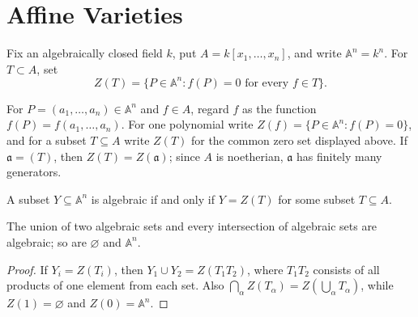 
\section{Affine Varieties}

Fix an algebraically closed field $k$, put $A=k[x_1,\ldots,x_n]$, and write
\(\mathbb A^n=k^n\).  For $T\subset A$, set
\[
Z(T)=\{P\in\mathbb A^n:f(P)=0\text{ for every }f\in T\}.
\]

\begin{definition}
\label{def:ha-ch1-polynomial-evaluation}
\leanok
For $P=(a_1,\ldots,a_n)\in\mathbb A^n$ and $f\in A$, regard $f$ as the function
$f(P)=f(a_1,\ldots,a_n)$.  For one polynomial write
$Z(f)=\{P\in\mathbb A^n:f(P)=0\}$, and for a subset $T\subseteq A$ write $Z(T)$
for the common zero set displayed above.  If $\mathfrak a=(T)$, then
$Z(T)=Z(\mathfrak a)$; since $A$ is noetherian, $\mathfrak a$ has finitely many generators.
\end{definition}

\begin{definition}
\label{def:ha-ch1-algebraic-set}
A subset $Y\subseteq\mathbb A^n$ is algebraic if and only if $Y=Z(T)$ for some subset
$T\subseteq A$.
\end{definition}

\begin{proposition}
\label{prop:ha-ch1-1-1}
The union of two algebraic sets and every intersection of algebraic sets are algebraic; so are
$\varnothing$ and $\mathbb A^n$.
\end{proposition}
\begin{proof}
If $Y_i=Z(T_i)$, then $Y_1\cup Y_2=Z(T_1T_2)$, where $T_1T_2$ consists of all products
of one element from each set.  Also $\bigcap_\alpha Z(T_\alpha)=Z(\bigcup_\alpha T_\alpha)$,
while $Z(1)=\varnothing$ and $Z(0)=\mathbb A^n$.
\end{proof}

